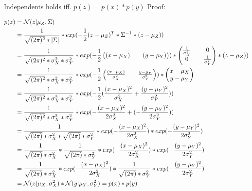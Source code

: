 Independents holds iff. $p(z) = p(x)*p(y) $ Proof:

\begin{align*}
p(z) &= \mathcal{N}(z|\mu_Z,\Sigma) \\
&= \frac{1}{\sqrt{(2\pi)^2}*|\Sigma|}*exp(-\frac{1}{2}(z-\mu_Z)^T *\Sigma^{-1}*(z-\mu_Z) )\\
&=\frac{1}{\sqrt{(2\pi)^2}*\sigma_{X}^2 *\sigma_{Y}^2  } * exp(-\frac{1}{2}\begin{pmatrix} (x-\mu_{X}) && (y-\mu_{Y}) \end{pmatrix}) 
*\begin{pmatrix}
\frac{1}{\sigma_{X}^2} && 0 \\
0           && \frac{1}{\sigma_{Y}^2} 
\end{pmatrix}
*(z-\mu_Z) )\\
&=\frac{1}{\sqrt{(2\pi)^2}*\sigma_{X}^2 *\sigma_{Y}^2  } * exp(-\frac{1}{2}\begin{pmatrix} \frac{(x-\mu_{X})}{\sigma_{X}^2} && \frac{y-\mu_{Y}}{\sigma_{Y}^2} \end{pmatrix}) 
*\begin{pmatrix}
x-\mu_{X} \\
y-\mu_{Y} 
\end{pmatrix} \\
&=\frac{1}{\sqrt{(2\pi)^2}*\sigma_{X}^2 *\sigma_{Y}^2  } * exp(-\frac{1}{2} (\frac{(x-\mu_{X})^2}{\sigma_{X}^2} + \frac{(y-\mu_{Y})^2}{\sigma_{Y}^2}) )\\
&=\frac{1}{\sqrt{(2\pi)^2}*\sigma_{X}^2 *\sigma_{Y}^2  } * exp(-\frac{(x-\mu_{X})^2}{2\sigma_{X}^2} + (-\frac{(y-\mu_{Y})^2}{2\sigma_{Y}^2}) )\\ 
&=\frac{1}{\sqrt{(2\pi)}*\sigma_{X}^2 * \sqrt{(2\pi)}* \sigma_{Y}^2  } * exp(-\frac{(x-\mu_{X})^2}{2\sigma_{X}^2}) * exp (-\frac{(y-\mu_{Y})^2}{2\sigma_{Y}^2})\\ 
&=\frac{1}{\sqrt{(2\pi)}*\sigma_{X}^2}*\frac{1}{\sqrt{(2\pi)}* \sigma_{Y}^2  } * exp(-\frac{(x-\mu_{X})^2}{2\sigma_{X}^2}) * exp (-\frac{(y-\mu_{Y})^2}{2\sigma_{Y}^2})\\
&=\frac{1}{\sqrt{(2\pi)}*\sigma_{X}^2} * exp(-\frac{(x-\mu_{X})^2}{2\sigma_{X}^2}) * \frac{1}{\sqrt{(2\pi)}* \sigma_{Y}^2  } * exp (-\frac{(y-\mu_{Y})^2}{2\sigma_{Y}^2})\\
&= \mathcal{N}(x|\mu_X,\sigma_X^2) * \mathcal{N}(y|\mu_Y,\sigma_Y^2) = p(x)*p(y) \\
\end{align*}

